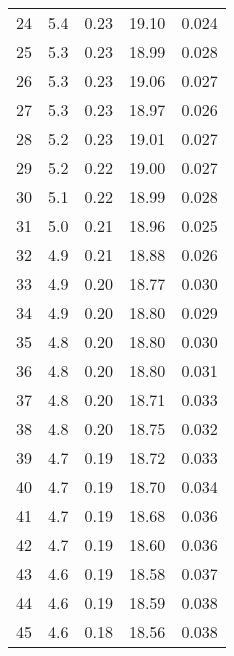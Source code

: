 \begin{table}
\begin{tabular}{c|ll|ll}
24 & 5.4 & 0.23 & 19.10 & 0.024 \\
25 & 5.3 & 0.23 & 18.99 & 0.028 \\
26 & 5.3 & 0.23 & 19.06 & 0.027 \\
27 & 5.3 & 0.23 & 18.97 & 0.026 \\
28 & 5.2 & 0.23 & 19.01 & 0.027 \\
29 & 5.2 & 0.22 & 19.00 & 0.027 \\
30 & 5.1 & 0.22 & 18.99 & 0.028 \\
31 & 5.0 & 0.21 & 18.96 & 0.025 \\
32 & 4.9 & 0.21 & 18.88 & 0.026 \\
33 & 4.9 & 0.20 & 18.77 & 0.030 \\
34 & 4.9 & 0.20 & 18.80 & 0.029 \\
35 & 4.8 & 0.20 & 18.80 & 0.030 \\
36 & 4.8 & 0.20 & 18.80 & 0.031 \\
37 & 4.8 & 0.20 & 18.71 & 0.033 \\
38 & 4.8 & 0.20 & 18.75 & 0.032 \\
39 & 4.7 & 0.19 & 18.72 & 0.033 \\
40 & 4.7 & 0.19 & 18.70 & 0.034 \\
41 & 4.7 & 0.19 & 18.68 & 0.036 \\
42 & 4.7 & 0.19 & 18.60 & 0.036 \\
43 & 4.6 & 0.19 & 18.58 & 0.037 \\
44 & 4.6 & 0.19 & 18.59 & 0.038 \\
45 & 4.6 & 0.18 & 18.56 & 0.038 \\
               \hline
        \end{tabular}
    \end{table}
    \clearpage

